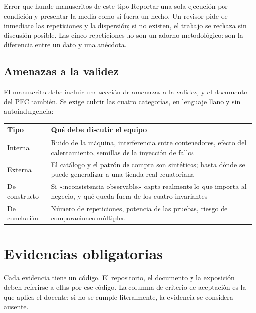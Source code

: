 \documentclass[11pt,a4paper]{article}
\begin{document}
\begin{alerta}{Error que hunde manuscritos de este tipo}
	Reportar una sola ejecución por condición y presentar la media como si fuera un hecho. Un revisor pide de inmediato las repeticiones y la dispersión; si no existen, el trabajo se rechaza sin discusión posible. Las cinco repeticiones no son un adorno metodológico: son la diferencia entre un dato y una anécdota.
\end{alerta}

\subsection{Amenazas a la validez}

El manuscrito debe incluir una sección de amenazas a la validez, y el documento del PFC también. Se exige cubrir las cuatro categorías, en lenguaje llano y sin autoindulgencia:

\begin{center}
	\small
	\begin{tabular}{@{}p{3.4cm}p{11.6cm}@{}}
		\toprule
		\textbf{Tipo} & \textbf{Qué debe discutir el equipo} \\
		\midrule
		Interna & Ruido de la máquina, interferencia entre contenedores, efecto del calentamiento, semillas de la inyección de fallos \\
		\addlinespace
		Externa & El catálogo y el patrón de compra son sintéticos; hasta dónde se puede generalizar a una tienda real ecuatoriana \\
		\addlinespace
		De constructo & Si «inconsistencia observable» capta realmente lo que importa al negocio, y qué queda fuera de los cuatro invariantes \\
		\addlinespace
		De conclusión & Número de repeticiones, potencia de las pruebas, riesgo de comparaciones múltiples \\
		\bottomrule
	\end{tabular}
\end{center}

\section{Evidencias obligatorias}

Cada evidencia tiene un código. El repositorio, el documento y la exposición deben referirse a ellas por ese código. La columna de criterio de aceptación es la que aplica el docente: si no se cumple literalmente, la evidencia se considera ausente.
\end{document}

